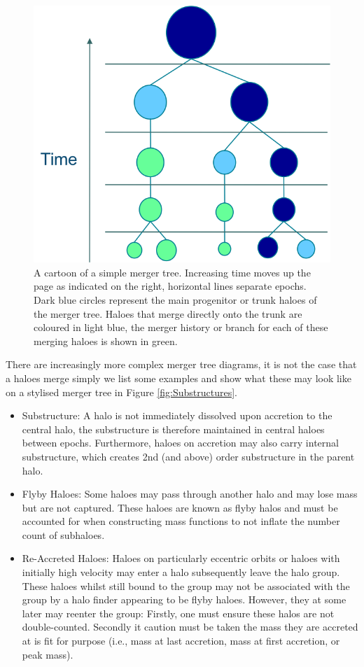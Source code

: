 \begin{figure}[h]
    \centering
    \includegraphics[width = \linewidth]{Figures/Chapter1/Merger_Tree_Simple.png}
    \caption{A cartoon of a simple merger tree. Increasing time moves up the page as indicated on the right, horizontal lines separate epochs. Dark blue circles represent the main progenitor or trunk haloes of the merger tree. Haloes that merge directly onto the trunk are coloured in light blue, the merger history or branch for each of these merging haloes is shown in green.}
    \label{fig:SimpleTree}
\end{figure}

There are increasingly more complex merger tree diagrams, it is not the case that a haloes merge simply we list some examples and show what these may look like on a stylised merger tree in Figure \ref{fig:Substructures}.

\begin{itemize}
    \item Substructure: A halo is not immediately dissolved upon accretion to the central halo, the substructure is therefore maintained in central haloes between epochs. Furthermore, haloes on accretion may also carry internal substructure, which creates 2nd (and above) order substructure in the parent halo.
    \item Flyby Haloes: Some haloes may pass through another halo and may lose mass but are not captured. These haloes are known as flyby halos and must be accounted for when constructing mass functions to not inflate the number count of subhaloes.
    \item Re-Accreted Haloes: Haloes on particularly eccentric orbits or haloes with initially high velocity may enter a halo subsequently leave the halo group. These haloes whilst still bound to the group may not be associated with the group by a halo finder appearing to be flyby haloes. However, they at some later may reenter the group: Firstly, one must ensure these halos are not double-counted. Secondly it caution must be taken the mass they are accreted at is fit for purpose (i.e., mass at last accretion, mass at first accretion, or peak mass).
\end{itemize}

